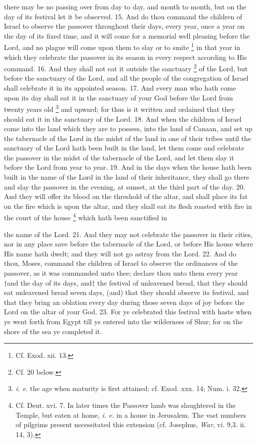there may be no passing over from day to day, and month to month, but on the day of its festival let it be observed. 15. And do thou command the children of Israel to observe the passover throughout their days, every year, once a year on the day of its fixed time, and it will come for a memorial well pleasing before the Lord, and no plague will come upon them to slay or to smite \footnote{Cf. Exod. xii. 13.} in that year in which they celebrate the passover in its season in every respect according to His command. 16. And they shall not eat it outside the sanctuary \footnote{Cf. 20 below.} of the Lord, but before the sanctuary of the Lord, and all the people of the congregation of Israel shall celebrate it in its appointed season. 17. And every man who hath come upon its day shall eat it in the sanctuary of your God before the Lord from twenty years old \footnote{\emph{i. e.} the age when maturity is first attained; cf. Exod. xxx. 14; Num. i. 32.} and upward; for thus is it written and ordained that they should eat it in the sanctuary of the Lord. 18. And when the children of Israel come into the land which they are to possess, into the land of Canaan, and set up the tabernacle of the Lord in the midst of the land in one of their tribes until the sanctuary of the Lord hath been built in the land, let them come and celebrate the passover in the midst of the tabernacle of the Lord, and let them slay it before the Lord from year to year. 19. And in the days when the house hath been built in the name of the Lord in the land of their inheritance, they shall go there and slay the passover in the evening, at sunset, at the third part of the day. 20. And they will offer its blood on the threshold of the altar, and shall place its fat on the fire which is upon the altar, and they shall eat its flesh roasted with fire in the court of the house \footnote{Cf. Deut. xvi. 7. In later times the Passover lamb was slaughtered in the Temple, but eaten at home, \emph{i. e.} in a house in Jerusalem. The vast numbers of pilgrims present necessitated this extension (cf. Josephus, \emph{War}, vi. 9,3. ii. 14, 3).} which hath been sanctified in

the name of the Lord. 21. And they may not celebrate the passover in their cities,  nor in any place save before the tabernacle of the Lord, or before His house where His name hath dwelt; and they will not go astray from the Lord. 22. And do thou, Moses, command the children of Israel to observe the ordinances of the passover, as it was commanded unto thee; declare thou unto them every year †and the day of its days, and†  the festival of unleavened bread, that they should eat unleavened bread seven days, (and) that they should observe its festival, and that they bring an oblation every day during those seven days of joy before the Lord on the altar of your God. 23. For ye celebrated this festival with haste  when ye went forth from Egypt till ye entered into the wilderness of Shur;  for on the shore of the sea ye completed it.

